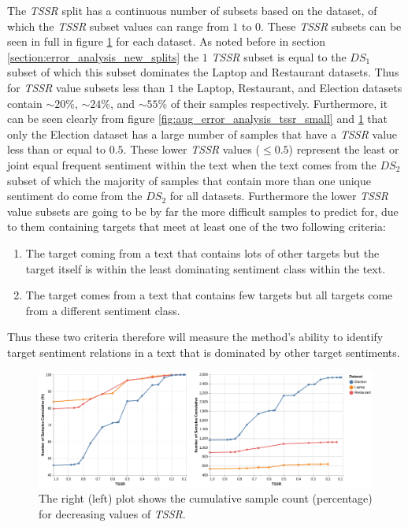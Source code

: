 The \textit{TSSR} split has a continuous number of subsets based on the dataset, of which the \textit{TSSR} subset values can range from $1$ to $0$. These \textit{TSSR} subsets can be seen in full in figure \ref{fig:aug_error_analysis_tssr_full} for each dataset. As noted before in section \ref{section:error_analysis_new_splits} the $1$ \textit{TSSR} subset is equal to the $DS_1$ subset of which this subset dominates the Laptop and Restaurant datasets. Thus for \textit{TSSR} value subsets less than $1$ the Laptop, Restaurant, and Election datasets contain $\sim20\%$, $\sim24\%$, and $\sim55\%$ of their samples respectively. Furthermore, it can be seen clearly from figure \ref{fig:aug_error_analysis_tssr_small} and \ref{fig:aug_error_analysis_tssr_full} that only the Election dataset has a large number of samples that have a \textit{TSSR} value less than or equal to $0.5$. These lower \textit{TSSR} values ($\leq 0.5$) represent the least or joint equal frequent sentiment within the text when the text comes from the $DS_2$ subset of which the majority of samples that contain more than one unique sentiment do come from the $DS_2$ for all datasets. Furthermore the lower \textit{TSSR} value subsets are going to be by far the more difficult samples to predict for, due to them containing targets that meet at least one of the two following criteria:
\begin{enumerate}
    \item The target coming from a text that contains lots of other targets but the target itself is within the least dominating sentiment class within the text.
    \item The target comes from a text that contains few targets but all targets come from a different sentiment class.
\end{enumerate}
Thus these two criteria therefore will measure the method's ability to identify target sentiment relations in a text that is dominated by other target sentiments.

\begin{figure}[!ht]
    \centering
    \includegraphics[scale=0.4]{images/augmentation/error_analysis/tssr_full_range.png}
    \caption{The right (left) plot shows the cumulative sample count (percentage) for decreasing values of \textit{TSSR}.}
    \label{fig:aug_error_analysis_tssr_full}
\end{figure}

